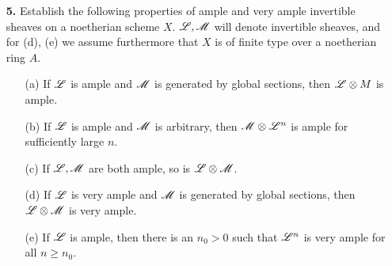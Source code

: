 \documentclass{article}
\begin{document}
\begin{enumerate} [label=\textbf{\arabic*.}, leftmargin=-0em]
\begin{proof} $ $ \vspace{0pt}
\begin{itemize} [leftmargin=0cm]
\item[(a)] Let $\fL$ be the invertible sheaf on $\PP^n$ associated to the morphism $\varphi : \PP^n \to \PP^m$, which is generated by global sections $s_i = \varphi^*(x_i)$, $i = 0, 1, \dots, m$.
Pick $P \in \varphi^{-1}((1, 0, \dots, 0))$ (we can assume such $P$ always exists by applying an automorphism of $\PP^m$).
Identifying $\fL_P \cong \fO_{P, \PP^n}$, we see that $(s_i)_P$ for $i \neq 0$ is not a unit, and they generate the local ring of $\fO_{P, \PP^n}$.
Since $\PP^n$ is smooth, the minimal number of generators of the maximal ideal of $\fO_{P, \PP^n}$ is equal to the dimension $n$.
The sections $s_i$ generate $\fO_{P, \PP^n}$.
Hence, $m \geq n$.
Our proof also shows the induced homomorphism of local rings $\varphi_P : \fO_{\varphi(P), \PP^m} \to \fO_{P, \PP^n}$ is surjective, which implies $\fO_{\varphi(P), \varphi(\PP^n)} = \fO_{\varphi(P), \PP^m} / \ker{\varphi_P} \cong \fO_{P, \PP^n}$.
Hence, $\varphi(P)$ has dimension $n$.
\end{itemize}
\end{proof}

\item[\textbf{5.}] Establish the following properties of ample and very ample invertible sheaves on a noetherian scheme $X$. $\mathscr{L}, \mathscr{M}$ will denote invertible sheaves, and for (d), (e) we assume furthermore that $X$ is of finite type over a noetherian ring $A$.
\begin{itemize}
    \item[(a)] If $\fL$ is ample and $\mathscr{M}$ is generated by global sections, then $\mathscr{L} \otimes M$ is ample.
    \item[(b)] If $\fL$ is ample and $\mathscr{M}$ is arbitrary, then $\mathscr{M} \otimes \mathscr{L}^n$ is ample for sufficiently large $n$.
    \item[(c)] If $\mathscr{L}, \mathscr{M}$ are both ample, so is $\mathscr{L} \otimes \mathscr{M}$.
    \item[(d)] If $\fL$ is very ample and $\mathscr{M}$ is generated by global sections, then $\mathscr{L} \otimes \mathscr{M}$ is very ample.
    \item[(e)] If $\fL$ is ample, then there is an $n_0 > 0$ such that $\mathscr{L}^n$ is very ample for all $n \geq n_0$.
\end{itemize}


\end{enumerate}
\end{document}
